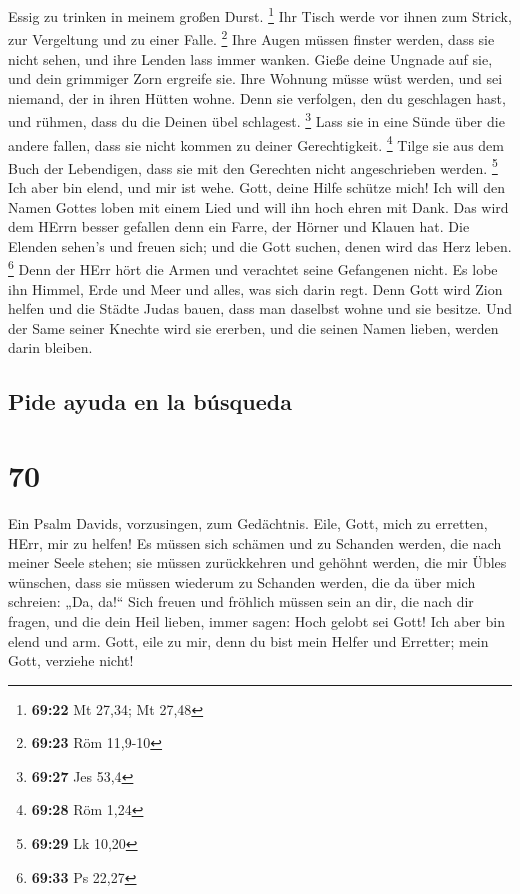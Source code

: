 Essig zu trinken in meinem großen Durst. \footnote{\textbf{69:22} Mt
  27,34; Mt 27,48}  Ihr Tisch werde vor ihnen zum Strick,
zur Vergeltung und zu einer Falle. \footnote{\textbf{69:23} Röm 11,9-10}
 Ihre Augen müssen finster werden, dass sie nicht sehen,
und ihre Lenden lass immer wanken.  Gieße deine Ungnade
auf sie, und dein grimmiger Zorn ergreife sie.  Ihre
Wohnung müsse wüst werden, und sei niemand, der in ihren Hütten wohne.
 Denn sie verfolgen, den du geschlagen hast, und rühmen,
dass du die Deinen übel schlagest. \footnote{\textbf{69:27} Jes 53,4}
 Lass sie in eine Sünde über die andere fallen, dass sie
nicht kommen zu deiner Gerechtigkeit. \footnote{\textbf{69:28} Röm 1,24}
 Tilge sie aus dem Buch der Lebendigen, dass sie mit den
Gerechten nicht angeschrieben werden. \footnote{\textbf{69:29} Lk 10,20}
 Ich aber bin elend, und mir ist wehe. Gott, deine Hilfe
schütze mich!  Ich will den Namen Gottes loben mit einem
Lied und will ihn hoch ehren mit Dank.  Das wird dem
HErrn besser gefallen denn ein Farre, der Hörner und Klauen hat.
 Die Elenden sehen's und freuen sich; und die Gott
suchen, denen wird das Herz leben. \footnote{\textbf{69:33} Ps 22,27}
 Denn der HErr hört die Armen und verachtet seine
Gefangenen nicht.  Es lobe ihn Himmel, Erde und Meer und
alles, was sich darin regt.  Denn Gott wird Zion helfen
und die Städte Judas bauen, dass man daselbst wohne und sie besitze.
 Und der Same seiner Knechte wird sie ererben, und die
seinen Namen lieben, werden darin bleiben.

\hypertarget{pide-ayuda-en-la-buxfasqueda}{%
\subsection{Pide ayuda en la
búsqueda}\label{pide-ayuda-en-la-buxfasqueda}}

\hypertarget{section-69}{%
\section{70}\label{section-69}}

 Ein Psalm Davids, vorzusingen, zum Gedächtnis.
 Eile, Gott, mich zu erretten, HErr, mir zu helfen!
 Es müssen sich schämen und zu Schanden werden, die nach
meiner Seele stehen; sie müssen zurückkehren und gehöhnt werden, die mir
Übles wünschen,  dass sie müssen wiederum zu Schanden
werden, die da über mich schreien: „Da, da!{}``  Sich
freuen und fröhlich müssen sein an dir, die nach dir fragen, und die
dein Heil lieben, immer sagen: Hoch gelobt sei Gott!  Ich
aber bin elend und arm. Gott, eile zu mir, denn du bist mein Helfer und
Erretter; mein Gott, verziehe nicht!

